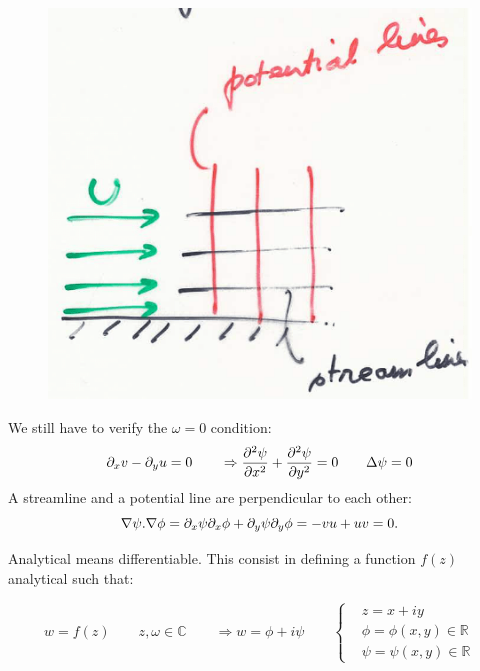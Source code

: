 \documentclass[british,french,11pt, a4paper, openany]{article}
\begin{document}
\begin{figure}
	\vspace{-5mm}
	\includegraphics[scale=0.2]{ch2/24}
	\label{fig:2.23}
\end{figure}
We still have to verify the $\omega=0$ condition:
\begin{equation}
\D _x v - \D _y u = 0 \qquad \Rightarrow \frac{\D ^2 \psi}{\D x^2} + \frac{\D ^2 \psi}{\D y^2} = 0 \qquad \Delta \psi = 0
\end{equation}
A streamline and a potential line are perpendicular to each other:
\begin{equation}
\nabla \psi . \nabla \phi = \D _x \psi \D _x \phi + \D_ y \psi \D _y \phi = -vu + uv = 0. 
\end{equation}

	Analytical means differentiable. This consist in defining a function $f(z)$ analytical such that:

\begin{equation}
w = f(z) \qquad z,\omega \in \mathbb{C} \qquad \Rightarrow w = \phi +i \psi \qquad \left\{
\begin{aligned}
&z= x+iy\\ 		 
&\phi = \phi (x,y) \in \mathbb{R}\\
&\psi =  \psi(x,y) \in \mathbb{R}
\end{aligned} 		  
\right.
\end{equation}
\end{document}
